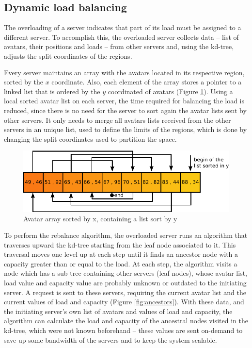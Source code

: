 \documentclass[acmjacm]{acmtrans2m}
\newcommand{\figurecaption}{Figure}
\begin{document}
\subsection{Dynamic load balancing}

The overloading of a server indicates that part of its load must be assigned to a different server. To accomplish this, the overloaded server collects data -- list of avatars, their positions and loads -- from other servers and, using the kd-tree, adjusts the split coordinates of the regions.

Every server maintains an array with the avatars located in its respective region, sorted by the $x$ coordinate. Also, each element of the array stores a pointer to a linked list that is ordered by the $y$ coordinated of avatars (\figurecaption{} \ref{fig:vectorxlisty}). Using a local sorted avatar list on each server, the time required for balancing the load is reduced, since there is no need for the server to sort again the avatar lists sent by other servers. It only needs to merge all avatars lists received from the other servers in an unique list, used to define the limits of the regions, which is done by changing the split coordinates used to partition the space.

\begin{figure}
  \centering
  \includegraphics[width=0.9\linewidth]{images/vectorxlisty}
  \caption{Avatar array sorted by x, containing a list sort by y}
   \label{fig:vectorxlisty}
\end{figure}

To perform the rebalance algorithm, the overloaded server runs an algorithm that traverses upward the kd-tree starting from the leaf node associated to it. This traversal moves one level up at each step until it finds an ancestor node with a capacity greater than or equal to the load. At each step, the algorithm visits a node which has a sub-tree containing other servers (leaf nodes), whose avatar list, load value and capacity value are probably unknown or outdated to the initiating server. A request is sent to these servers, requiring the current avatar list and the current values of load and capacity (\figurecaption{} \ref{fig:ancestors}). With these data, and the initiating server's own list of avatars and values of load and capacity, the algorithm can calculate the load and capacity of the ancestral nodes visited in the kd-tree, which were not known beforehand -- these values are sent on-demand to save up some bandwidth of the servers and to keep the system scalable.
\end{document}
